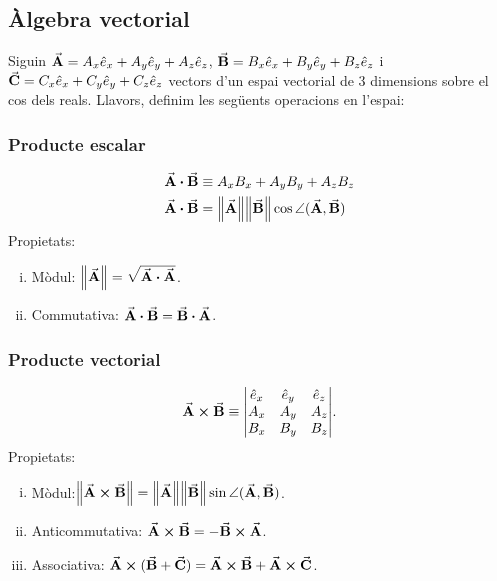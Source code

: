 \section{\mytitle}
\subsection{Àlgebra vectorial}
Siguin $\va{A} = A_{x} \hat{e}_{x} + A_{y} \hat{e}_{y} + A_{z} \hat{e}_{z}$, $\va{B} = B_{x} \hat{e}_{x} + B_{y} \hat{e}_{y} + B_{z} \hat{e}_{z}$ i $\va{C} = C_{x} \hat{e}_{x} + C_{y} \hat{e}_{y} + C_{z} \hat{e}_{z}$ vectors d'un espai vectorial de 3 dimensions sobre el cos dels reals. Llavors, definim les següents operacions en l'espai:

\subsubsection*{Producte escalar}
\begin{align}
	\begin{aligned}
		\va{A} \vdot \va{B} & \equiv A_{x} B_{x} + A_{y} B_{y} + A_{z} B_{z} \\
		\va{A} \vdot \va{B} & = \norm{\va{A}} \norm{\va{B}} \cos \angle (\va{A}, \va{B}) \\
	\end{aligned}
\end{align}
Propietats:
\begin{enumerate}[(i)]
	\item Mòdul: $\norm{\va{A}} = \sqrt{\va{A} \vdot \va{A}}$.
	\item Commutativa: $\va{A} \vdot \va{B} = \va{B} \vdot \va{A}$.
\end{enumerate}

\subsubsection*{Producte vectorial}
\begin{align}
	\va{A} \cross \va{B} \equiv \mqty| \hat{e}_{x} & \hat{e}_{y} & \hat{e}_{z} \\ A_{x} & A_{y} & A_{z} \\ B_{x} & B_{y} & B_{z} |.
\end{align}
Propietats:
\begin{enumerate}[(i)]
	\item Mòdul:$ \norm{\va{A} \cross \va{B}} = \norm{\va{A}} \norm{\va{B}} \sin \angle (\va{A}, \va{B})$.
	\item Anticommutativa: $\va{A} \cross \va{B} = - \va{B} \cross \va{A}$.
	\item Associativa: $\va{A} \cross (\va{B} + \va{C}) = \va{A} \cross \va{B} + \va{A} \cross \va{C}$.
\end{enumerate}

